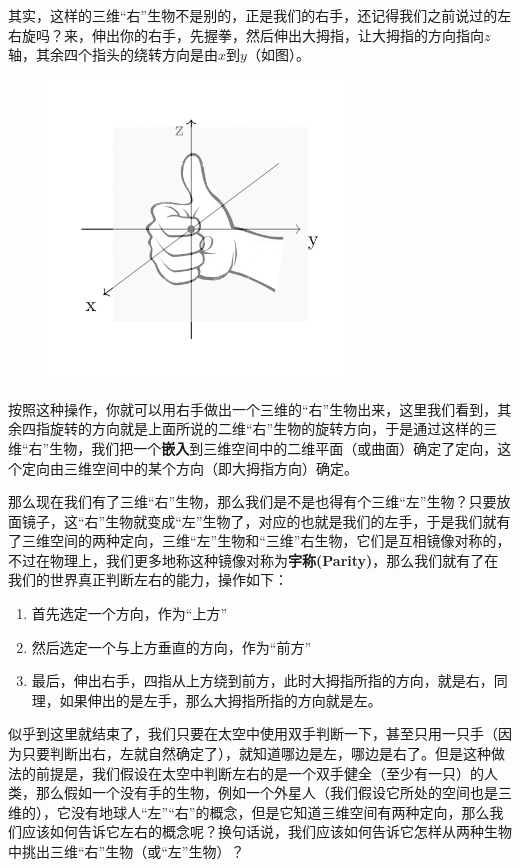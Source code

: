 \documentclass[hyperref,UTF8]{ctexart}
\begin{document}
其实，这样的三维“右”生物不是别的，正是我们的右手，还记得我们之前说过的左右旋吗？来，伸出你的右手，先握拳，然后伸出大拇指，让大拇指的方向指向$z$轴，其余四个指头的绕转方向是由$x$到$y$（如图）。
\begin{figure}[H]
    \centering
    \includegraphics[width=8cm]{大拇指.png}
\end{figure}
按照这种操作，你就可以用右手做出一个三维的“右”生物出来，这里我们看到，其余四指旋转的方向就是上面所说的二维“右”生物的旋转方向，于是通过这样的三维“右”生物，我们把一个\textbf{嵌入}到三维空间中的二维平面（或曲面）确定了定向，这个定向由三维空间中的某个方向（即大拇指方向）确定。

那么现在我们有了三维“右”生物，那么我们是不是也得有个三维“左”生物？只要放面镜子，这“右”生物就变成“左”生物了，对应的也就是我们的左手，于是我们就有了三维空间的两种定向，三维“左”生物和“三维”右生物，它们是互相镜像对称的，不过在物理上，我们更多地称这种镜像对称为\textbf{宇称(Parity)}，那么我们就有了在我们的世界真正判断左右的能力，操作如下：
\begin{enumerate}
    \item 首先选定一个方向，作为“上方”
    \item 然后选定一个与上方垂直的方向，作为“前方”
    \item 最后，伸出右手，四指从上方绕到前方，此时大拇指所指的方向，就是右，同理，如果伸出的是左手，那么大拇指所指的方向就是左。
\end{enumerate}
似乎到这里就结束了，我们只要在太空中使用双手判断一下，甚至只用一只手（因为只要判断出右，左就自然确定了），就知道哪边是左，哪边是右了。但是这种做法的前提是，我们假设在太空中判断左右的是一个双手健全（至少有一只）的人类，那么假如一个没有手的生物，例如一个外星人（我们假设它所处的空间也是三维的），它没有地球人“左”“右”的概念，但是它知道三维空间有两种定向，那么我们应该如何告诉它左右的概念呢？换句话说，我们应该如何告诉它怎样从两种生物中挑出三维“右”生物（或“左”生物）？
\end{document}
